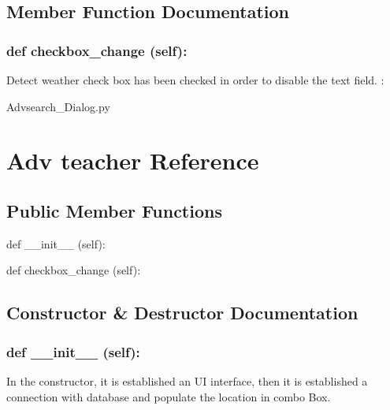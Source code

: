 \subsection{Member Function Documentation}
\hypertarget{class_poly_a14a7ad77ce612b0c54f531d307ee4b39}{
\subsubsection[{def checkbox_change (self):}]{\setlength{\rightskip}{0pt plus 5cm}def {checkbox\_change} (self):}}\label{class_poly_a14a7ad77ce612b0c54f531d307ee4b39}
Detect weather check box has been checked in order to disable the text field.
:\begin{DoxyCompactItemize}
\item 
Advsearch\_Dialog.\-py\end{DoxyCompactItemize}



\hypertarget{Adv_teacher}{\section{Adv teacher Reference}
\label{Adv_teacher}
}
\subsection*{Public Member Functions}
\begin{DoxyCompactItemize}
\item 
def {\_\_init\_\_} (self):
\item 
def {checkbox\_change} (self):

\end{DoxyCompactItemize}

\subsection{Constructor \& Destructor Documentation}
\hypertarget{class_poly_aa3def076b74bed67904976ad4f9fe9b1}{
\subsubsection[{def __init__ (self):}]{\setlength{\rightskip}{0pt plus 5cm}def {\_\_init\_\_} (self): 
}}
In the constructor, it is established an UI interface, then it is  established a connection with database and populate the location in combo Box.
 

